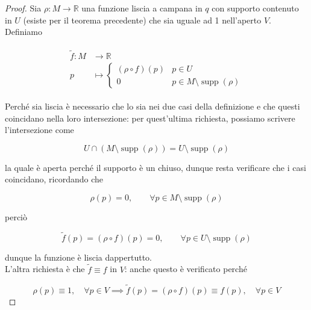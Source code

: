 \begin{proof}
	Sia $ \rho : M \to \mathbb{R} $ una funzione liscia a campana in $ q $ con supporto contenuto in $ U $ (esiste per il teorema precedente) che sia uguale ad 1 nell'aperto $ V $.\\
	Definiamo
	
	\begin{align}
		\begin{split}
			\tilde{f} : M &\to \mathbb{R}\\
			p &\mapsto %
			\begin{cases}
				(\rho \circ f)(p) & p \in U\\
				0 & p \in M \setminus \operatorname{supp}(\rho)
			\end{cases}
		\end{split}
	\end{align}

	Perché sia liscia è necessario che lo sia nei due casi della definizione e che questi coincidano nella loro intersezione: per quest'ultima richiesta, possiamo scrivere l'intersezione come
	
	\begin{equation}
		U \cap (M \setminus \operatorname{supp}(\rho)) = U \setminus \operatorname{supp}(\rho)
	\end{equation}

	la quale è aperta perché il supporto è un chiuso, dunque resta verificare che i casi coincidano, ricordando che
	
	\begin{equation}
		\rho(p) = 0, \qquad \forall p \in M \setminus \operatorname{supp}(\rho)
	\end{equation}

	perciò
	
	\begin{equation}
		\tilde{f}(p) = (\rho \circ f)(p) = 0, \qquad \forall p \in U \setminus \operatorname{supp}(\rho)
	\end{equation}

	dunque la funzione è liscia dappertutto.\\
	L'altra richiesta è che $ \tilde{f} \equiv f $ in $ V $: anche questo è verificato perché
	
	\begin{equation}
		\rho(p) \equiv 1, \quad \forall p \in V \implies \tilde{f}(p) = (\rho \circ f)(p) \equiv f(p), \quad \forall p \in V
	\end{equation}
\end{proof}


